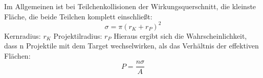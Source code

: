 \documentclass[Ex4_Zusammenfassung.tex]{subfiles}
\begin{document}
Im Allgemeinen ist bei Teilchenkollisionen der Wirkungsquerschnitt, die kleinste Fläche, die beide Teilchen komplett einschließt: 
\begin{equation}
\sigma = \pi (r_{K} + r_{P})^2 
\end{equation}
Kernradius: $ r_K $ \qquad Projektilradius: $ r_P $ \newline
Hieraus ergibt sich die Wahrscheinlichkeit, dass n Projektile mit dem Target wechselwirken, als das Verhältnis der effektiven Flächen:
\begin{equation}
P = \frac{n \sigma}{A}
\end{equation}
\end{document}
